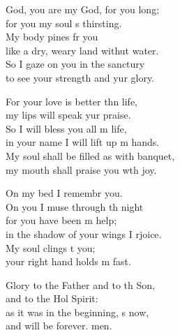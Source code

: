 \settowidth{\versewidth}{My soul shall be filled as with a banquet,    *}
\begin{psalmverse}%
  \begin{patverse}
     God, you are my God, for you  long;\Med\\
for you my soul \pointup{\i}s thirsting.\\
My body pines fr you\Med\\
like a dry, weary land withut water.\\
So I gaze on you in the sanctury\Med\\
to see your strength and yur glory.

For your love is better thn life,\Med\\
my lips will speak yur praise.\\
So I will bless you all m life,\Med\\
in your name I will lift up m hands.\\
My soul shall be filled as with  banquet,\Med\\
my mouth shall praise you w\pointup{\i}th joy.

On my bed I remembr you.\Med\\
On you I muse through th night\\
for you have been m help;\Med\\
in the shadow of your wings I rjoice.\\
My soul clings t you;\Med\\
your right hand holds m fast.

Glory to the Father and to th Son,\Med\\
and to the Hol Spirit:\\
as it was in the beginning, \pointup{\i}s now,\Med\\
and will be forever. men.
  \end{patverse}
\end{psalmverse}
